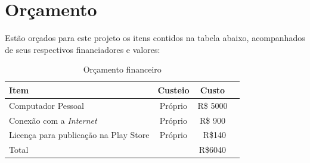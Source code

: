 \documentclass[
	12pt,				    %
	openright,			    %
	oneside,			    %
	a4paper,			    %
    sumario=tradicional,    %
	english,			    %
	brazil,				    %
	]{abntex2}              %
\begin{document}
\chapter{Orçamento}\label{sec:orcamento}

Estão orçados para este projeto os itens contidos na tabela abaixo, acompanhados de seus respectivos financiadores e valores:

\par

\begin{table}[htpb]
	\centering
	\caption[Orçamento]{Orçamento financeiro}
	\label{tab:orcamento}
	\begin{tabular}{lccc}
		\toprule
		\textbf{Item}                         & \textbf{Custeio} & \textbf{Custo} \\
		\midrule
		Computador Pessoal                    & Próprio          & R\$ 5000       \\
		Conexão com a \textit{Internet}       & Próprio          & R\$ 900        \\
		Licença para publicação na Play Store & Próprio          & ~R\$140        \\
		\bottomrule
		Total                                 &                  & R\$6040        \\
	\end{tabular}%
\end{table}%


\postextual


\printbibliography[title={Referências Bibliográficas}]

\end{document}
